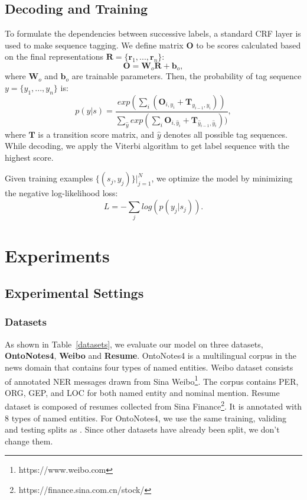 \documentclass[conference]{IEEEtran}
\begin{document}
\subsection{Decoding and Training}
To formulate the dependencies between successive labels, a standard CRF layer
is used to make sequence tagging.
We define matrix $\textbf{O}$ to be scores calculated based on the 
final representations $\textbf{R}=\{ \textbf{r}_1,...,\textbf{r}_n \}$: 
\begin{equation}
\textbf{O} = \textbf{W}_o \textbf{R} + \textbf{b}_o,
\end{equation}
where $\textbf{W}_o$ and $\textbf{b}_o$ are trainable parameters.
Then, the probability of tag sequence $y=\{ y_1,...,y_n\}$ is:
\begin{equation}
    p(y|s) =  \frac{
        exp(\sum_{i}(
\textbf{O}_{i,y_i}
            +\textbf{T}_{  y_{i-1},y_i  }))
        }
        {\sum_{\hat{y}} exp(\sum_i 
\textbf{O}_{i,\hat{y}_i}
        +\textbf{T}_{\hat{y}_{i-1},\hat{y}_i}))},
 \end{equation}
where $\textbf{T}$ is a transition score matrix,
and $\hat{y}$ denotes all possible tag sequences.
While decoding, we apply the Viterbi \cite{viterbi1967error} algorithm to get label sequence with the highest score.


Given training examples $\{ (s_j, y_j )\} |^N_{j=1}$, we optimize the model by minimizing
the negative log-likelihood loss:
\begin{equation}
    L = - \sum_{j} log(p(y_j|s_j)).
\end{equation}




\section{Experiments}
\subsection{Experimental Settings}
\subsubsection{Datasets}
As shown in Table~\ref{datasets}, we evaluate our model on three datasets, \textbf{OntoNotes4}, \textbf{Weibo} and \textbf{Resume}. OntoNotes4 is a multilingual corpus in the news domain
 that contains four types of named entities. {Weibo} 
dataset consists of annotated NER messages drawn 
from Sina Weibo\footnote{https://www.weibo.com}.
The corpus contains PER, ORG, GEP, and LOC for both named entity and nominal mention. 
{Resume} dataset is composed of resumes collected from Sina Finance\footnote{https://finance.sina.com.cn/stock/}.
It is annotated with 8 types of named entities.
For OntoNotes4, we use the same training, validing and testing splits as \cite{DBLP:conf/naacl/CheWML13}. Since other datasets have already been split, we don't change them. 
\end{document}
